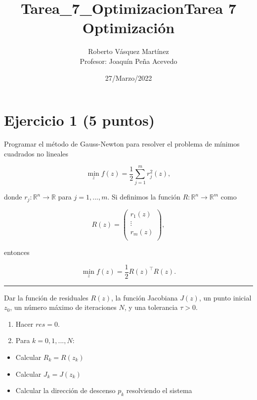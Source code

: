 \documentclass[11pt]{article}
\title{Tarea\_7\_Optimizacion}
\providecommand{\tightlist}{%
      \setlength{\itemsep}{0pt}\setlength{\parskip}{0pt}}
\begin{document}
    
    \title{Tarea 7 Optimización}
    \author{Roberto Vásquez Martínez \\ Profesor: Joaquín Peña Acevedo}
    \date{27/Marzo/2022}
    \maketitle   

    \hypertarget{ejercicio-1-5-puntos}{%
\section{Ejercicio 1 (5 puntos)}\label{ejercicio-1-5-puntos}}

Programar el método de Gauss-Newton para resolver el problema de mínimos
cuadrados no lineales

\[ \min_z  f(z) = \frac{1}{2} \sum_{j=1}^m r_j^2(z), \]

donde \(r_j: \mathbb{R}^n \rightarrow \mathbb{R}\) para \(j=1,...,m\).
Si definimos la función \(R: \mathbb{R}^n \rightarrow \mathbb{R}^m\)
como

\[ R(z) = \left( \begin{array}{c}
            r_{1}(z) \\
            \vdots \\
            r_{m}(z) \\
        \end{array} \right),
\]

entonces

\[ \min_z  f(z) = \frac{1}{2} R(z)^\top R(z). \]

\begin{center}\rule{0.5\linewidth}{0.5pt}\end{center}

Dar la función de residuales \(R(z)\), la función Jacobiana \(J(z)\), un
punto inicial \(z_0\), un número máximo de iteraciones \(N\), y una
tolerancia \(\tau>0\).

\begin{enumerate}
\def\labelenumi{\arabic{enumi}.}
\item
  Hacer \(res=0\).
\item
  Para \(k = 0, 1, ..., N\):
\end{enumerate}

\begin{itemize}
\tightlist
\item
  Calcular \(R_k = R(z_k)\)
\item
  Calcular \(J_{k} = J(z_k)\)
\item
  Calcular la dirección de descenso \(p_k\) resolviendo el sistema
\end{itemize}
\end{document}
